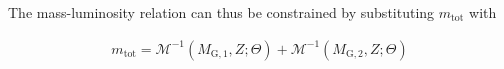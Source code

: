 The mass-luminosity relation can thus be constrained by substituting $m_{\mathrm{tot}}$ with

\begin{align}
    m_{\mathrm{tot}} = \mathcal{M}^{-1}(M_{\mathrm{G},1},Z;\Theta) + \mathcal{M}^{-1}(M_{\mathrm{G},2},Z;\Theta)
\end{align}




